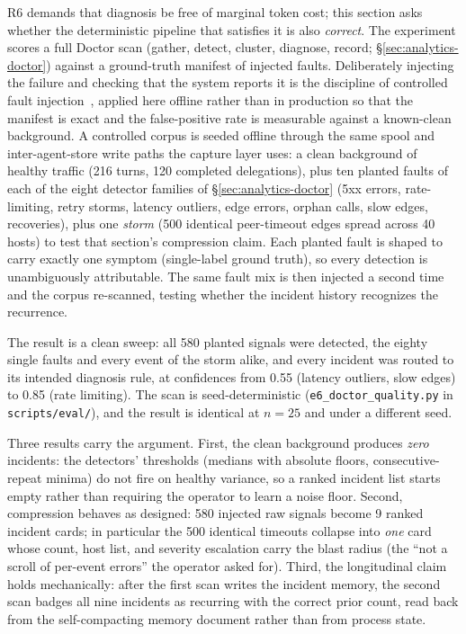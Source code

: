 R6 demands that diagnosis be free of marginal token cost; this section
asks whether the deterministic pipeline that satisfies it is also
\emph{correct}. The experiment scores a full Doctor scan (gather,
detect, cluster, diagnose, record; \S\ref{sec:analytics-doctor})
against a ground-truth manifest of
injected faults. Deliberately injecting the failure and checking that the
system reports it is the discipline of controlled fault
injection~\cite{basiri2016chaos}, applied here offline rather than in
production so that the manifest is exact and the false-positive rate is
measurable against a known-clean background.
A controlled corpus is seeded offline through the same
spool and inter-agent-store write paths the capture layer uses: a clean
background of healthy traffic (216 turns, 120 completed delegations),
plus ten planted faults of each of the eight detector families of
\S\ref{sec:analytics-doctor} (5xx errors, rate-limiting, retry storms,
latency outliers, edge errors, orphan calls, slow edges, recoveries),
plus one \emph{storm} (500 identical peer-timeout edges spread across 40
hosts) to test that section's compression claim. Each planted fault is
shaped to carry exactly one symptom (single-label ground truth), so every
detection is unambiguously attributable. The same fault mix is then
injected a second time and the corpus re-scanned, testing whether the
incident history recognizes the recurrence.

The result is a clean sweep: all 580 planted signals were detected, the
eighty single faults and every event of the storm alike, and every
incident was routed to its intended diagnosis rule, at confidences from
0.55 (latency outliers, slow edges) to 0.85 (rate limiting). The scan is
seed-deterministic (\texttt{e6\_doctor\_\allowbreak quality.py} in
\texttt{scripts/eval/}), and the result is identical at $n{=}25$ and
under a different seed.

Three results carry the argument. First, the clean background
produces \emph{zero} incidents: the detectors' thresholds (medians with
absolute floors, consecutive-repeat minima) do not fire on healthy
variance, so a ranked incident list starts empty rather than requiring
the operator to learn a noise floor. Second, compression behaves as
designed: 580 injected raw signals become 9 ranked incident cards;
in particular the 500 identical timeouts collapse into \emph{one} card
whose count, host list, and severity escalation carry the blast radius
(the ``not a scroll of per-event errors'' the operator asked for). Third,
the longitudinal claim holds mechanically: after the first scan writes the incident
memory, the second scan badges all nine incidents as recurring with the
correct prior count, read back from the self-compacting memory document
rather than from process state.

